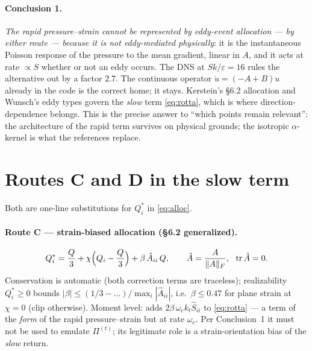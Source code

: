 \documentclass[11pt,a4paper]{article}
\newcommand{\Pir}[1]{\Pi^{(\mathrm r)}_{#1}}
\newcommand{\kt}{k_t}
\newcommand{\Qs}{Q^{*}}
\begin{document}
\paragraph{Conclusion 1.} \emph{The rapid pressure--strain cannot be
represented by eddy-event allocation --- by either route --- because it is
not eddy-mediated physically}: it is the instantaneous Poisson response of
the pressure to the mean gradient, linear in $A$, and it acts at rate
$\propto S$ whether or not an eddy occurs. The DNS at $Sk/\varepsilon=16$
rules the alternative out by a factor $2.7$. The continuous operator
$\dot u=(-A+B)u$ already in the code is the correct home; it stays.
Kerstein's \S6.2 allocation and Wunsch's eddy types govern the \emph{slow}
term \eqref{eq:rotta}, which is where direction-dependence belongs. This is
the precise answer to ``which points remain relevant'': the architecture of
the rapid term survives on physical grounds; the isotropic $\alpha$-kernel
is what the references replace.

\section{Routes C and D in the slow term}

Both are one-line substitutions for $\Qs_i$ in \eqref{eq:alloc}.

\paragraph{Route C --- strain-biased allocation (\S6.2 generalized).}
\begin{equation}
  \Qs_i=\frac{Q}{3}+\chi\Bigl(Q_i-\frac{Q}{3}\Bigr)+\beta\,\hat A_{ii}\,Q,
  \qquad \hat A=\frac{A}{\|A\|_F},\ \ \operatorname{tr}\hat A=0.
  \label{eq:routeC}
\end{equation}
Conservation is automatic (both correction terms are traceless);
realizability $\Qs_i\ge0$ bounds $|\beta|\le(1/3-\ldots)/\max_i|\hat A_{ii}|$,
i.e.\ $\beta\le0.47$ for plane strain at $\chi=0$ (clip otherwise).
Moment level: adds $2\beta\,\omega_e\kt\hat S_{ii}$ to \eqref{eq:rotta} ---
a term of the \emph{form} of the rapid pressure--strain but at rate
$\omega_e$. Per Conclusion~1 it must not be used to emulate $\Pir{}$; its
legitimate role is a strain-orientation bias of the \emph{slow} return.
\end{document}
